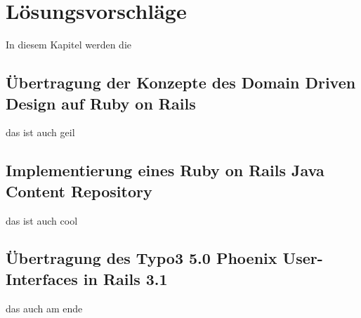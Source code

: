 \chapter{Lösungsvorschläge}
In diesem Kapitel werden die
\section{Übertragung der Konzepte des Domain Driven Design auf Ruby on Rails}
das ist auch geil
\section{Implementierung eines Ruby on Rails Java Content Repository}
das ist auch cool
\section{Übertragung des Typo3 5.0 Phoenix User-Interfaces in Rails 3.1}
das auch am ende


